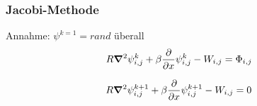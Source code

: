 \begin{frame}
\frametitle{Jacobi-Methode}
Annahme: $\psi^{k=1}=rand$ überall
\begin{align}
    R \mathbf{\bm{\nabla}}^2 \psi^k_{i,j} + \beta \frac{\partial}{\partial x}\psi^k_{i,j} - W_{i,j}
    &=
    \Phi_{i,j}
\end{align}

\begin{align}
    R \mathbf{\bm{\nabla}}^2 \psi^{k+1}_{i,j} + \beta \frac{\partial}{\partial x} \psi^{k+1}_{i,j} - W_{i,j}
    &=
   0
\end{align}
\end{frame}





